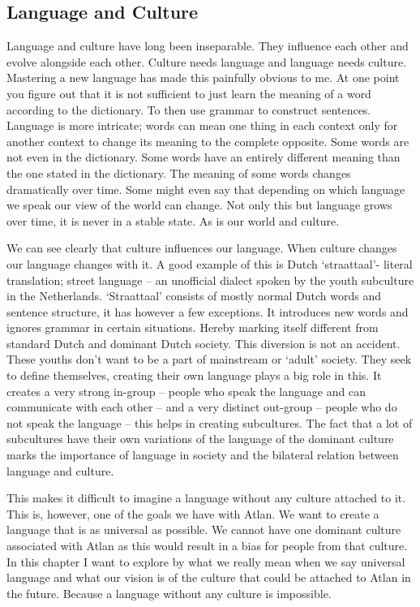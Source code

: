\subsection{Language and Culture}

\noindent Language and culture have long been inseparable. They influence each other and evolve alongside each other. Culture needs language and language needs culture. Mastering a new language has made this painfully obvious to me. At one point you figure out that it is not sufficient to just learn the meaning of a word according to the dictionary. To then use grammar to construct sentences. Language is more intricate; words can mean one thing in each context only for another context to change its meaning to the complete opposite. Some words are not even in the dictionary. Some words have an entirely different meaning than the one stated in the dictionary. The meaning of some words changes dramatically over time. Some might even say that depending on which language we speak our view of the world can change. Not only this but language grows over time, it is never in a stable state. As is our world and culture.  

We can see clearly that culture influences our language. When culture changes our language changes with it. A good example of this is Dutch ‘straattaal’- literal translation; street language – an unofficial dialect spoken by the youth subculture in the Netherlands. ‘Straattaal’ consists of mostly normal Dutch words and sentence structure, it has however a few exceptions. It introduces new words and ignores grammar in certain situations. Hereby marking itself different from standard Dutch and dominant Dutch society. This diversion is not an accident. These youths don’t want to be a part of mainstream or ‘adult’ society. They seek to define themselves, creating their own language plays a big role in this. It creates a very strong in-group – people who speak the language and can communicate with each other – and a very distinct out-group – people who do not speak the language – this helps in creating subcultures. The fact that a lot of subcultures have their own variations of the language of the dominant culture marks the importance of language in society and the bilateral relation between language and culture.  

This makes it difficult to imagine a language without any culture attached to it. This is, however, one of the goals we have with Atlan. We want to create a language that is as universal as possible. We cannot have one dominant culture associated with Atlan as this would result in a bias for people from that culture. In this chapter I want to explore by what we really mean when we say universal language and what our vision is of the culture that could be attached to Atlan in the future. Because a language without any culture is impossible.  

